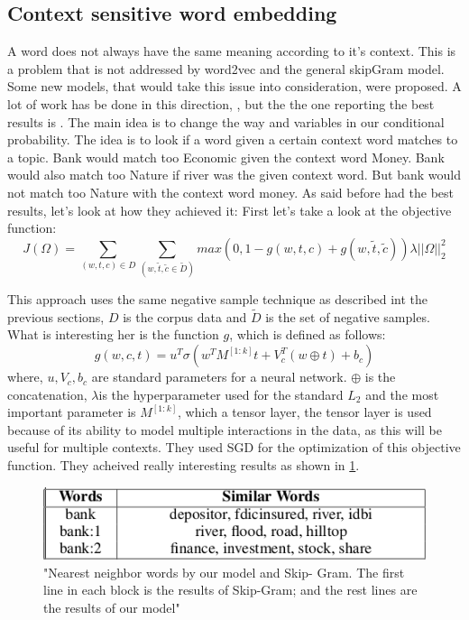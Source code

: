 \subsection{Context sensitive word embedding}
A word does not always have the same meaning according to it's context. This is a problem that is not addressed by word2vec and the general skipGram model. Some new models, that would take this issue into consideration, were proposed. A lot of work has be done in this direction, \cite{topicalWE},  \cite{breaking} but the the one reporting the best results is \cite{contextWithTensor}. The main idea is to change the way and variables in our conditional probability. The idea is to look if a word given a certain context word matches to a topic. Bank would match too Economic given the context word Money. Bank would also match too Nature if river was the given context word. But bank would not match too Nature with the context word money. As said before \cite{contextWithTensor} had the best results, let's look at how they achieved it: 
First let's take a look at the objective function:
\begin{equation}
J(\Omega) = \sum_{(w,t,c)\in D} \sum_{(w,\tilde{t},\tilde{c} \in{\tilde{D}})} max(0,1- g(w,t,c) + g(w,\tilde{t},\tilde{c})) \lambda||\Omega||_{2}^2
\end{equation}

This approach uses the same negative sample technique as described int the previous sections, $D$ is the corpus data and $\tilde{D}$ is the set of negative samples. What is interesting her is the function $g$, which is defined as follows: 
\begin{equation}
g(w,c,t) = u^T \sigma(w^TM^{[1:k]}t+V_c^T(w \oplus t) + b_c)
\end{equation}
where, $u, V_c, b_c$ are standard parameters for a neural network. $\oplus$ is the concatenation, $\lambda$is the hyperparameter used for the standard $L_2$ and  the most important parameter is $M^{[1:k]}$, which a tensor layer, the tensor layer is used because of its ability to model multiple interactions in the data, as this will be useful for multiple contexts. They used SGD for the optimization of this objective function.  They acheived really interesting results as shown in \ref{fig:multipleContext}.
\begin{figure}[ht]
    \centering
			\includegraphics[scale=0.7]{images/multipleContext.png} 
    \caption{"Nearest  neighbor  words  by  our  model  and  Skip-
Gram. The first line in each block is the results of Skip-Gram;
and the rest lines are the results of our model" \cite{contextWithTensor}}
    \label{fig:multipleContext}
\end{figure}



